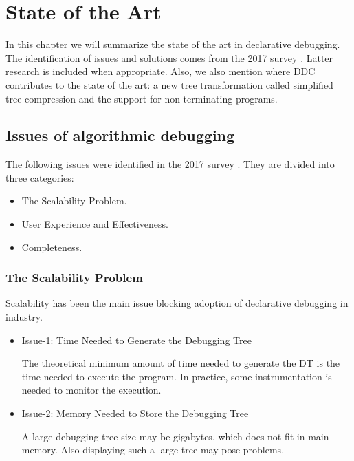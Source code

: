 \chapter{State of the Art}
\label{cap:stateOfTheArt}

In this chapter we will summarize the state of the art in declarative debugging.
%
The identification of issues and solutions comes from the 2017 survey \cite{Survey}. Latter research is included when appropriate. Also, we also mention where DDC contributes to the state of the art: a new tree transformation called simplified tree compression and the support for non-terminating programs.

\section{Issues of algorithmic debugging}
The following issues were identified in the 2017 survey \cite{Survey}. They are divided into three categories:
\begin{itemize}
    \item The Scalability Problem.
    \item User Experience and Effectiveness.
    \item Completeness.
\end{itemize}
\subsection{The Scalability Problem}
Scalability has been the main issue blocking adoption of declarative debugging in industry.
\begin{itemize}
    \item Issue-1: Time Needed to Generate the Debugging Tree
    
The theoretical minimum amount of time needed to generate the DT is the time needed to execute the program. In practice, some instrumentation is needed to monitor the execution.
    \item Issue-2: Memory Needed to Store the Debugging Tree

A large debugging tree size may be gigabytes, which does not fit in main memory. Also displaying such a large tree may pose problems.
\end{itemize}
